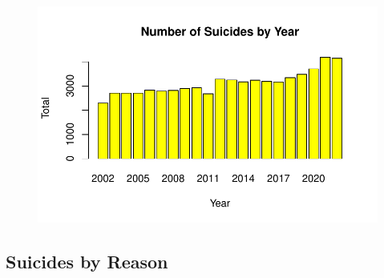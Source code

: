 \documentclass[
  11pt,
  a4paper,
  DIV=11,
  numbers=noendperiod]{scrartcl}
\begin{document}
\begin{figure}[H]

{\centering \includegraphics{analysis_files/figure-pdf/unnamed-chunk-7-1.pdf}

}

\end{figure}

\hypertarget{suicides-by-reason}{%
\subsection{\texorpdfstring{\textbf{Suicides by
Reason}}{Suicides by Reason}}\label{suicides-by-reason}}
\end{document}
